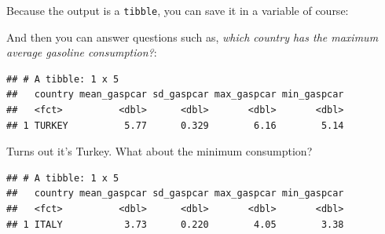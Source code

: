 \documentclass[]{gitbook}
\newenvironment{Shaded}{\begin{snugshade}}{\end{snugshade}}
\newcommand{\DataTypeTok}[1]{\textcolor[rgb]{0.13,0.29,0.53}{#1}}
\newcommand{\KeywordTok}[1]{\textcolor[rgb]{0.13,0.29,0.53}{\textbf{#1}}}
\newcommand{\NormalTok}[1]{#1}
\newcommand{\OperatorTok}[1]{\textcolor[rgb]{0.81,0.36,0.00}{\textbf{#1}}}
\newcommand{\StringTok}[1]{\textcolor[rgb]{0.31,0.60,0.02}{#1}}
\theoremstyle{definition}
\theoremstyle{definition}
\theoremstyle{definition}
\theoremstyle{remark}
\begin{document}
Because the output is a \texttt{tibble}, you can save it in a variable
of course:

\begin{Shaded}
\end{Shaded}

And then you can answer questions such as, \emph{which country has the
maximum average gasoline consumption?}:

\begin{Shaded}
\end{Shaded}

\begin{verbatim}
## # A tibble: 1 x 5
##   country mean_gaspcar sd_gaspcar max_gaspcar min_gaspcar
##   <fct>          <dbl>      <dbl>       <dbl>       <dbl>
## 1 TURKEY          5.77      0.329        6.16        5.14
\end{verbatim}

Turns out it's Turkey. What about the minimum consumption?

\begin{Shaded}
\end{Shaded}

\begin{verbatim}
## # A tibble: 1 x 5
##   country mean_gaspcar sd_gaspcar max_gaspcar min_gaspcar
##   <fct>          <dbl>      <dbl>       <dbl>       <dbl>
## 1 ITALY           3.73      0.220        4.05        3.38
\end{verbatim}
\end{document}
